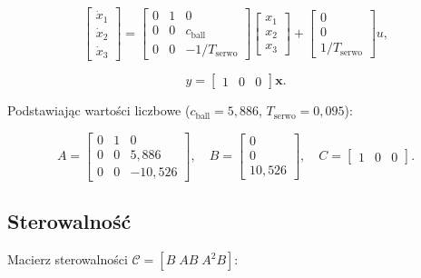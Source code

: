 \begin{equation}
  \begin{bmatrix} \dot{x}_1 \\ \dot{x}_2 \\ \dot{x}_3 \end{bmatrix}
  =
  \begin{bmatrix} 0 & 1 & 0 \\ 0 & 0 & c_{\mathrm{ball}} \\ 0 & 0 & -1/T_{\mathrm{serwo}} \end{bmatrix}
  \begin{bmatrix} x_1 \\ x_2 \\ x_3 \end{bmatrix}
  +
  \begin{bmatrix} 0 \\ 0 \\ 1/T_{\mathrm{serwo}} \end{bmatrix} u,
  \label{eq:statespace}
\end{equation}

\begin{equation}
  y = \begin{bmatrix} 1 & 0 & 0 \end{bmatrix} \mathbf{x}.
\end{equation}

Podstawiając wartości liczbowe ($c_{\mathrm{ball}} = 5{,}886$, $T_{\mathrm{serwo}} = 0{,}095$):

\begin{equation}
  A = \begin{bmatrix} 0 & 1 & 0 \\ 0 & 0 & 5{,}886 \\ 0 & 0 & -10{,}526 \end{bmatrix},
  \quad
  B = \begin{bmatrix} 0 \\ 0 \\ 10{,}526 \end{bmatrix},
  \quad
  C = \begin{bmatrix} 1 & 0 & 0 \end{bmatrix}.
\end{equation}

\subsection{Sterowalność}

Macierz sterowalności $\mathcal{C} = [B\;AB\;A^2B]$:

